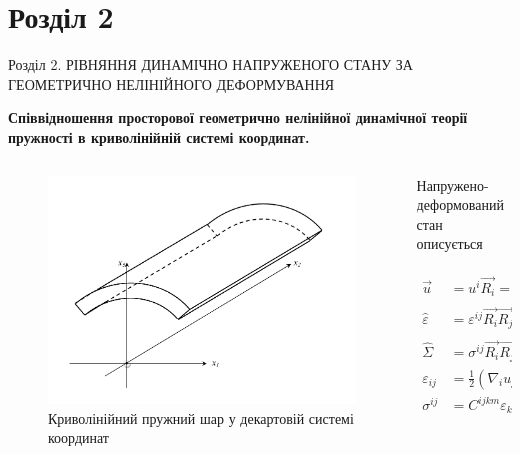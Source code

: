 \documentclass[8pt]{beamer}
\numberwithin{figure}{section}
\numberwithin{equation}{section}
\numberwithin{table}{section}
\begin{document}
\section{Розділ 2}

\begin{frame}{Розділ 2. РІВНЯННЯ ДИНАМІЧНО НАПРУЖЕНОГО СТАНУ ЗА ГЕОМЕТРИЧНО НЕЛІНІЙНОГО ДЕФОРМУВАННЯ}

\textbf{Співвідношення просторової геометрично нелінійної динамічної теорії пружності в криволінійній системі координат.
}

\begin{columns}
	\begin{column}{0.35\linewidth}
		\begin{figure}
			\includegraphics[scale=0.15]{pic/layer.png}
			\caption{Криволінійний пружний шар у декартовій системі координат}
			\label{fig:21}
		\end{figure}
	\end{column}
	\begin{column}{0.65\textwidth}
    	\begin{center}
	    	Напружено-деформований стан описується
    	\end{center}
\begin{align}
\vec{u} &= u^i \vec{R_i}=u_i \vec{R^i},\\
\hat{\varepsilon} &= \varepsilon^{ij} \vec{R_i}\vec{R_j}=\varepsilon_{ij} \vec{R^i}\vec{R^j},\\
\hat{\Sigma} &= \sigma^{ij} \vec{R_i}\vec{R_j}=\sigma_{ij} \vec{R^i}\vec{R^j},\\
\varepsilon_{ij} &= \frac{1}{2} \left( \nabla_i u_j + \nabla_j u_i + \nabla_i u^j \nabla_j u_k \right),\\
\sigma^{ij} &= C^{ijkm}\varepsilon_{km}.
\end{align}
	\end{column}
\end{columns}


\end{frame}
\end{document}
